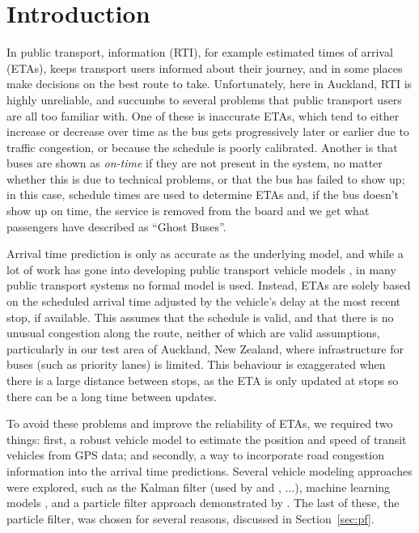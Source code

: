 \section{Introduction}
\label{sec:intro}



In public transport, \rt information (RTI), for example estimated times of arrival (ETAs),
keeps transport users informed about their journey,
and in some places make decisions on the best route to take.
Unfortunately, here in Auckland, RTI is highly unreliable,
and succumbs to several problems that public transport users
are all too familiar with.
One of these is inaccurate ETAs,
which tend to either increase or decrease over time as the bus gets progressively later or earlier
due to traffic congestion, or  because the schedule is poorly calibrated.
Another is that buses are shown as \emph{on-time} if they are not present
in the \rt system,
no matter whether this is due to technical problems,
or that the bus has failed to show up;
in this case, schedule times are used to determine ETAs and, 
if the bus doesn't show up on time,
the service is removed from the \rt board 
and we get what passengers have described as ``Ghost Buses''.

Arrival time prediction is only as accurate as the underlying model,
and while a lot of work has gone into developing public transport vehicle models
\citep{Cathey_2003,Jeong_2005,Yu_2011,Hans_2015},
in many public transport systems no formal model is used.
Instead, ETAs are solely based on the scheduled arrival time
adjusted by the vehicle's delay at the most recent stop, if available.
This assumes that the schedule is valid,
and that there is no unusual congestion along the route,
neither of which are valid assumptions,
particularly in our test area of Auckland, New Zealand,
where infrastructure for buses (such as priority lanes) is limited.
This behaviour is exaggerated when there is a large distance between stops,
as the ETA is only updated at stops so there can be a long time between updates.


To avoid these problems and improve the reliability of ETAs,
we required two things:
first, a robust vehicle model to estimate the position and speed
of transit vehicles from \rt GPS data;
and secondly, a way to incorporate road congestion information 
into the arrival time predictions.
Several vehicle modeling approaches were explored, 
such as the Kalman filter (used by \cite{Dailey_2001} and \cite{Cathey_2003}, ...),
machine learning models \citep{Yu_2006,Chang_2010},
and a particle filter approach demonstrated
by \cite{Hans_2015}.
The last of these, the particle filter, was chosen for several reasons,
discussed in Section~\ref{sec:pf}.


